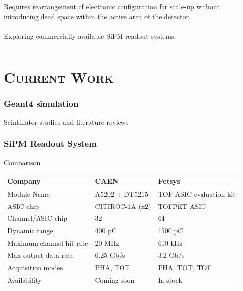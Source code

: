 \documentclass[xcolor=x11names, compress, handout]{beamer}
\renewcommand{\(}{\begin{columns}}
\renewcommand{\)}{\end{columns}}
\newcommand{\<}[1]{\begin{column}{#1}}
\renewcommand{\>}{\end{column}}
\begin{document}
\begin{frame}
\begin{center}
\begin{columns}
\begin{column}{0.3\textwidth}
  \raggedright \scriptsize Requires rearrangement of electronic configuration for scale-up 
  without introducing dead space within the active area of the detector \\
  \ \\
  Exploring commercially available SiPM readout systems.
  \vspace{0.4cm}
  \end{column}
  \end{columns}
  \end{center}
\end{frame}

\section{\scshape Current Work}

\begin{frame}[c]
\frametitle{Geant4 simulation}
  Scintillator studies and literature reviews
\end{frame}

\begin{frame}[c]
\frametitle{SiPM Readout System}
  
  \begin{block}{Comparison}
  \centering
  \begin{tabular}{@{}l l l}
  \hline
  Company & CAEN & Petsys \\
  \hline
  Module Name & A5202 + DT5215 & TOF ASIC evaluation kit \\
  ASIC chip & CITIROC-1A (x2) & TOFPET ASIC \\
  Channel/ASIC chip & 32 & 64 \\
  Dynamic range & 400 pC & 1500 pC \\
  Maximum channel hit rate & 20 MHz & 600 kHz  \\
  Max output data rate & 6.25 Gb/s & 3.2 Gb/s \\
  Acquisition modes & PHA, TOT & PHA, TOT, TOF \\
  Availability & Coming soon & In stock \\
  \hline
  \end{tabular}
  \end{block}
\end{frame}
\end{document}
